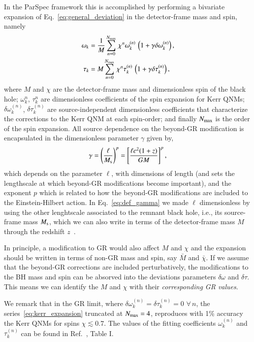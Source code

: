 \documentclass[twocolumn,
               prd,
               aps,
               superscriptaddress,
               tightenlines,
               nofootinbib,
               eqsecnum,
               amsfonts,
               amsmath,
               longbibliography]{revtex4-1}
\begin{document}
In the ParSpec framework this is accomplished by performing a bivariate
expansion of Eq.~\eqref{eq:general_deviation} in the detector-frame mass and
spin, namely
%
\begin{subequations}
\label{eq:kerr_expansion}
\begin{align}
\omega_{k} &= \frac{1}{M} \sum_{n = 0}^{N_{\rm max}} \, \chi^{n} \omega^{(n)}_{k} \, \left( 1 + \gamma \delta \omega^{(n)}_{k} \right), \\
\tau_{k}   &= M     \sum_{n = 0}^{N_{\rm max}} \, \chi^{n} \tau^{(n)}_{k}   \, \left( 1 + \gamma \delta \tau^{(n)}_{k} \right),
\end{align}
\end{subequations}
%
where $M$ and $\chi$ are the detector-frame mass and dimensionless spin of the
black hole; $\omega_{k}^{n}$, $\tau_{k}^{n}$ are dimensionless coefficients
of the spin expansion for Kerr QNMs; $\delta\omega_{k}^{(n)}$, $\delta\tau_{k}^{(n)}$ are
source-independent dimensionless coefficients that characterize the corrections to the Kerr QNM at each spin-order;
and finally $N_{\rm max}$ is the order of the spin expansion.
%
All source dependence on the beyond-GR modification is encapsulated in the dimensionless
parameter $\gamma$ given by,
%
\begin{equation}
\gamma
%
= \left(\frac{\ell}{M_{\rm s}}\right)^{p}
%
= \left[
\frac{\ell c^2 (1 + z)}{G M}
\right]^{p},
\label{eq:def_gamma}
\end{equation}
%
which depends on the parameter $\ell$, with dimensions of length (and sets the
lengthscale at which beyond-GR modifications become important), and
the exponent $p$ which is related to how the beyond-GR modifications are
included to the Einstein-Hilbert action.
%
In Eq.~\eqref{eq:def_gamma} we made $\ell$ dimensionless by using the other
lenghtscale associated to the remnant black hole, i.e., its source-frame mass
$M_{\rm s}$, which we can also write in terms of the detector-frame mass $M$ through
the redshift $z$~\cite{Krolak:1987ofj}.

In principle, a modification to GR would also affect $M$ and $\chi$ and the expansion should be written
in terms of non-GR mass and spin, say $\bar{M}$ and $\bar{\chi}$. If we assume that the beyond-GR corrections
are included perturbatively, the modifications to the BH mass and spin can be absorved into the deviations
parameters $\delta\omega$ and $\delta\tau$.
%
This means we can identify the $M$ and $\chi$ with their \emph{corresponding GR values}.

We remark that in the GR limit, where $\delta\omega_{k}^{(n)} = \delta\tau_{k}^{(n)} = 0$ $\forall\, n$,
the series~\eqref{eq:kerr_expansion} truncated at $N_{\rm max} = 4$, reproduces with 1\% accuracy
the Kerr QNMs for spins $\chi \lesssim 0.7$.
%
The values of the fitting coefficients $\omega_{k}^{(n)}$ and $\tau_{k}^{(n)}$
can be found in Ref.~\cite{Maselli:2019mjd}, Table I.
\end{document}
